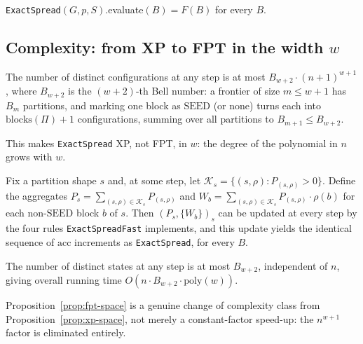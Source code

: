 \documentclass[ASNA,number]{USG}
\newcommand{\FF}{F}
\begin{document}
\begin{theorem}\label{thm:twig-correct}
\texttt{ExactSpread}$(G,p,S)$.evaluate$(B)=\FF(B)$ for every $B$.
\end{theorem}

\subsection{Complexity: from XP to FPT in the width $w$}\label{sec:twig-complexity}

\begin{proposition}\label{prop:xp-space}
The number of distinct configurations at any step is at most
$B_{w+2}\cdot(n+1)^{w+1}$, where $B_{w+2}$ is the $(w+2)$-th Bell number: a
frontier of size $m\le w+1$ has $B_m$ partitions, and marking one block as
$\mathrm{SEED}$ (or none) turns each into $\mathrm{blocks}(\Pi)+1$
configurations, summing over all partitions to $B_{m+1}\le B_{w+2}$.
\end{proposition}

This makes \texttt{ExactSpread} XP, not FPT, in $w$: the degree of the
polynomial in $n$ grows with $w$.

\begin{theorem}\label{thm:twig-collapse}
Fix a partition shape $s$ and, at some step, let
$\mathcal K_s=\{(s,\rho):P_{(s,\rho)}>0\}$. Define the aggregates
$P_s=\sum_{(s,\rho)\in\mathcal K_s}P_{(s,\rho)}$ and
$W_b=\sum_{(s,\rho)\in\mathcal K_s}P_{(s,\rho)}\cdot\rho(b)$ for each
non-$\mathrm{SEED}$ block $b$ of $s$. Then $(P_s,\{W_b\})_s$ can be updated
at every step by the four rules \texttt{ExactSpreadFast} implements, and
this update yields the identical sequence of $\mathrm{acc}$ increments as
\texttt{ExactSpread}, for every $B$.
\end{theorem}

\begin{proposition}\label{prop:fpt-space}
The number of distinct states at any step is at most $B_{w+2}$, independent
of $n$, giving overall running time $O(n\cdot B_{w+2}\cdot\mathrm{poly}(w))$.
\end{proposition}

Proposition~\ref{prop:fpt-space} is a genuine change of complexity class
from Proposition~\ref{prop:xp-space}, not merely a constant-factor speed-up:
the $n^{w+1}$ factor is eliminated entirely.
\end{document}
